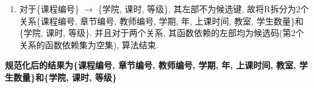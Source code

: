 \documentclass[10pt, a4paper]{article}
\begin{document}
\begin{enumerate}
\begin{enumerate}
			\begin{enumerate}
				\item 对于\{课程编号\} $\to$ \{学院, 课时, 等级\}, 其左部不为候选键, 故将R拆分为2个关系\{课程编号, 章节编号, 教师编号, 学期, 年, 上课时间, 教室, 学生数量\}和\{学院, 课时, 等级\}.
				并且对于两个关系, 其函数依赖的左部均为候选码(第2个关系的函数依赖集为空集), 算法结束.
			\end{enumerate} 
			\textbf{规范化后的结果为\{课程编号, 章节编号, 教师编号, 学期, 年, 上课时间, 教室, 学生数量\}和\{学院, 课时, 等级\}
}		\end{enumerate}
	\end{enumerate}
\end{document}
